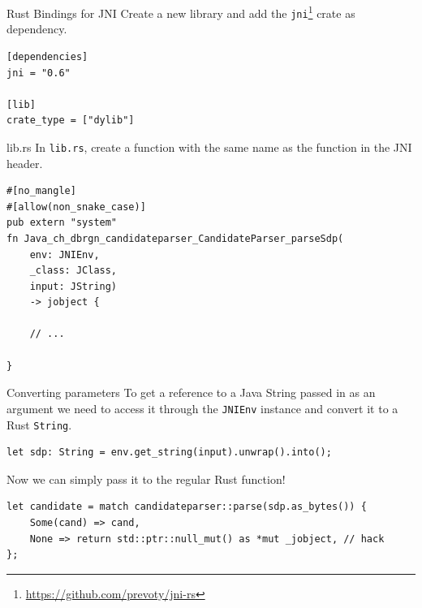 \documentclass[aspectratio=1610,14pt,t]{beamer}
\begin{document}
\begin{frame}[c,fragile]{Rust Bindings for JNI}
  Create a new library and add the
  \texttt{jni}\footnote{\url{https://github.com/prevoty/jni-rs}} crate as
  dependency.

  \begin{verbatim}
[dependencies]
jni = "0.6"

[lib]
crate_type = ["dylib"]
  \end{verbatim}

\end{frame}

\begin{frame}[c,fragile]{lib.rs}
  In \texttt{lib.rs}, create a function with the same name as the function in
  the JNI header.

  \begin{verbatim}
#[no_mangle]
#[allow(non_snake_case)]
pub extern "system"
fn Java_ch_dbrgn_candidateparser_CandidateParser_parseSdp(
    env: JNIEnv,
    _class: JClass,
    input: JString)
    -> jobject {

    // ...

}
  \end{verbatim}

\end{frame}

\begin{frame}[c,fragile]{Converting parameters}
  To get a reference to a Java String passed in as an argument we need to access
  it through the \texttt{JNIEnv} instance and convert it to a Rust
  \texttt{String}.

  \begin{verbatim}
let sdp: String = env.get_string(input).unwrap().into();
  \end{verbatim}

  Now we can simply pass it to the regular Rust function!

  \begin{verbatim}
let candidate = match candidateparser::parse(sdp.as_bytes()) {
    Some(cand) => cand,
    None => return std::ptr::null_mut() as *mut _jobject, // hack
};
  \end{verbatim}
\end{frame}
\end{document}

